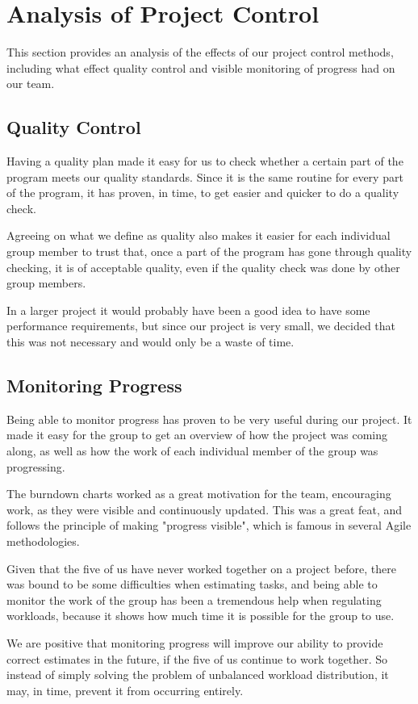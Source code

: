\section{Analysis of Project Control}
This section provides an analysis of the effects of our project control methods,
including what effect quality control and visible monitoring of progress had on
our team.

\subsection{Quality Control}
\label{sec:AnalysisQualityControl}
Having a quality plan made it easy for us to check whether a certain part of the
program meets our quality standards. Since it is the same routine for every part
of the program, it has proven, in time, to get easier and quicker to do a quality
check.

Agreeing on what we define as quality also makes it easier for each individual
group member to trust that, once a part of the program has gone through quality
checking, it is of acceptable quality, even if the quality check was done by
other group members.

In a larger project it would probably have been a good idea to have some
performance requirements, but since our project is very small, we decided that
this was not necessary and would only be a waste of time.

\subsection{Monitoring Progress}
\label{sec:AnalysisProgress}
Being able to monitor progress has proven to be very useful during our project. It
made it easy for the group to get an overview of how the project was coming along,
as well as how the work of each individual member of the group was progressing.

The burndown charts worked as a great motivation for the team, encouraging work, as
they were visible and continuously updated. This was a great feat, and follows the
principle of making "progress visible"\cite{xpe}, which is famous in several Agile
methodologies.

Given that the five of us have never worked together on a project before, there was
bound to be some difficulties when estimating tasks, and being able to monitor the
work of the group has been a tremendous help when regulating workloads,
because it shows how much time it is possible for the group to use.

We are positive that monitoring progress will improve our ability to provide correct
estimates in the future, if the five of us continue to work together. So instead of
simply solving the problem of unbalanced workload distribution, it may, in time, prevent
it from occurring entirely.